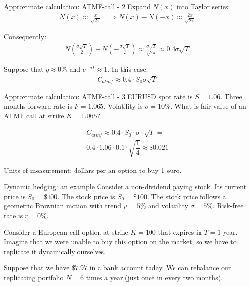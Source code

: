 \documentclass{beamer}
\begin{document}
\begin{frame}{Approximate calculation: ATMF-call - 2}
\justify
Expand $N(x)$ into Taylor series:
\begin{align*}
N(x) \approx \frac{x}{\sqrt{2\pi}} \quad \Rightarrow
N(x) - N(-x) \approx \frac{2x}{\sqrt{2\pi}}
\end{align*}

Consequently:
\begin{align*}
N\left(\frac{\sigma \sqrt{T}}{2}\right) - N\left(-\frac{\sigma \sqrt{T}}{2}\right)
\approx
\frac{\sigma\sqrt{T}}{\sqrt{2\pi}}
\approx
0.4\sigma\sqrt{T}
\end{align*}

Suppose that $q\approx 0\%$ and $e^{-qT} \approx 1$. In this case:
\begin{align*}
C_{atmf} \approx 0.4 \cdot S_0 \sigma \sqrt{T}
\end{align*}
\end{frame}



\begin{frame}{Approximate calculation: ATMF-call - 3}
\justify
EURUSD spot rate is $S=1.06$. Three months forward rate is $F=1.065$. Volatility is $\sigma=10\%$. What is fair value of an ATMF call at strike $K=1.065$?

\begin{align*}
C_{atmf} \approx 0.4 \cdot S_0 \cdot \sigma \cdot \sqrt{T} = \\
0.4 \cdot 1.06 \cdot 0.1 \cdot \sqrt{\dfrac{1}{4}} \approx \$0.021
\end{align*}

Units of measurement: dollars per an option to buy 1 euro.
\end{frame}



\begin{frame}{Dynamic hedging: an example}
\justify
Consider a non-dividend paying stock. Its current price is $S_0=\$100$. The stock price is $S_0=\$100$. The stock price follows a geometric Brownian motion with trend $\mu=5\%$ and volatility $\sigma=5\%$. Risk-free rate is $r=0\%$.

\justify
Consider a European call option at strike $K=100$ that expires in $T=1$ year. Imagine that we were unable to buy this option on the market, so we have to replicate it dynamically ourselves.

\justify
Suppose that we have $\$7.97$ in  a bank account today. We can rebalance our replicating portfolio $N=6$ times a year (just once in every two months).
\end{frame}
\end{document}
